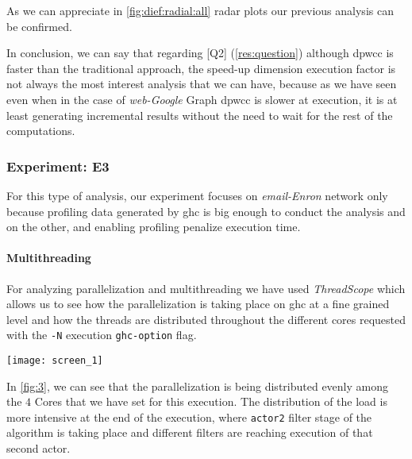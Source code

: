 As we can appreciate in \autoref{fig:dief:radial:all} radar plots our previous analysis can be confirmed.

In conclusion, we can say that regarding [Q2] (\autoref{res:question}) although \acrshort{dpwcc} is faster than the traditional approach, the speed-up dimension execution factor is not always the most interest analysis that we can have, because as we have seen even when in the case of \emph{web-Google} Graph \acrshort{dpwcc} is slower at execution, it is at least generating incremental results without the need to wait for the rest of the computations.

\subsubsection{Experiment: E3}
For this type of analysis, our experiment focuses on \emph{email-Enron} network \cite{netenron} only because profiling data generated by \acrshort{ghc} is big enough to conduct the analysis and on the other, and enabling profiling penalize execution time.

\paragraph{Multithreading} For analyzing parallelization and multithreading we have used \textit{ThreadScope} \cite{threadscope} which allows us to see how the parallelization is taking place on \acrshort{ghc} at a fine grained level and how the threads are distributed throughout the different cores requested with the \texttt{-N} execution \texttt{ghc-option} flag.

\begin{minipage}[t!]{\linewidth}

  \texttt{[image: screen\_1]}
  \captionsetup{type=figure}
  \label{fig:3}
\end{minipage}

In \autoref{fig:3}, we can see that the parallelization is being distributed evenly among the $4$ Cores that we have set for this execution.
The distribution of the load is more intensive at the end of the execution, where \texttt{actor2} filter stage 
of the algorithm is taking place and different filters are reaching execution of that second actor.

